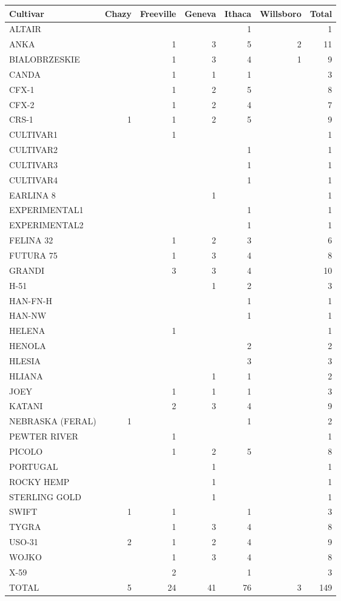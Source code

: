 \documentclass[
]{agujournal2019}
\begin{document}
\begin{longtable}[]{@{}lrrrrrr@{}}
\toprule\noalign{}
Cultivar & Chazy & Freeville & Geneva & Ithaca & Willsboro & Total \\
\midrule\noalign{}
\endhead
\bottomrule\noalign{}
\endlastfoot
ALTAIR & & & & 1 & & 1 \\
ANKA & & 1 & 3 & 5 & 2 & 11 \\
BIALOBRZESKIE & & 1 & 3 & 4 & 1 & 9 \\
CANDA & & 1 & 1 & 1 & & 3 \\
CFX-1 & & 1 & 2 & 5 & & 8 \\
CFX-2 & & 1 & 2 & 4 & & 7 \\
CRS-1 & 1 & 1 & 2 & 5 & & 9 \\
CULTIVAR1 & & 1 & & & & 1 \\
CULTIVAR2 & & & & 1 & & 1 \\
CULTIVAR3 & & & & 1 & & 1 \\
CULTIVAR4 & & & & 1 & & 1 \\
EARLINA 8 & & & 1 & & & 1 \\
EXPERIMENTAL1 & & & & 1 & & 1 \\
EXPERIMENTAL2 & & & & 1 & & 1 \\
FELINA 32 & & 1 & 2 & 3 & & 6 \\
FUTURA 75 & & 1 & 3 & 4 & & 8 \\
GRANDI & & 3 & 3 & 4 & & 10 \\
H-51 & & & 1 & 2 & & 3 \\
HAN-FN-H & & & & 1 & & 1 \\
HAN-NW & & & & 1 & & 1 \\
HELENA & & 1 & & & & 1 \\
HENOLA & & & & 2 & & 2 \\
HLESIA & & & & 3 & & 3 \\
HLIANA & & & 1 & 1 & & 2 \\
JOEY & & 1 & 1 & 1 & & 3 \\
KATANI & & 2 & 3 & 4 & & 9 \\
NEBRASKA (FERAL) & 1 & & & 1 & & 2 \\
PEWTER RIVER & & 1 & & & & 1 \\
PICOLO & & 1 & 2 & 5 & & 8 \\
PORTUGAL & & & 1 & & & 1 \\
ROCKY HEMP & & & 1 & & & 1 \\
STERLING GOLD & & & 1 & & & 1 \\
SWIFT & 1 & 1 & & 1 & & 3 \\
TYGRA & & 1 & 3 & 4 & & 8 \\
USO-31 & 2 & 1 & 2 & 4 & & 9 \\
WOJKO & & 1 & 3 & 4 & & 8 \\
X-59 & & 2 & & 1 & & 3 \\
TOTAL & 5 & 24 & 41 & 76 & 3 & 149 \\

\end{longtable}
\end{document}
